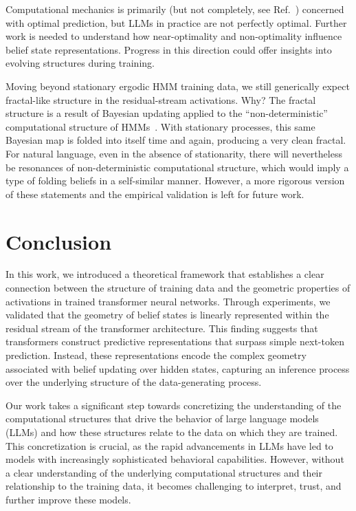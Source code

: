 \documentclass{article}
\begin{document}
Computational mechanics is primarily (but not completely, see Ref.~\cite{marzen2017nearly})  concerned with optimal prediction, but LLMs in practice are not perfectly optimal. Further work is needed to understand how near-optimality and non-optimality influence belief state representations. 
Progress in this direction 
could offer insights into 
evolving structures during
training.

Moving beyond stationary ergodic HMM training data, we still generically expect fractal-like structure in the residual-stream activations. Why? The fractal structure is a result of Bayesian updating applied to the “non-deterministic” computational structure of HMMs~\cite{jurgens2021divergent}. With stationary processes, this same Bayesian map is folded into itself time and again, producing a very clean fractal. For natural language, even in the absence of stationarity, there will nevertheless be resonances of non-deterministic computational structure, which would imply a type of folding beliefs in a self-similar manner. However, a more rigorous version of these statements and the empirical validation is left for future work.


\section{Conclusion}

In this work, we introduced a theoretical framework that establishes a clear connection between the structure of training data and the geometric properties of activations in trained transformer neural networks. %
Through experiments, we validated that the geometry of belief states is linearly represented within the residual stream of the transformer architecture. This finding suggests that transformers construct predictive representations that surpass simple next-token prediction. Instead, these representations encode the complex geometry associated with belief updating over hidden states, capturing an inference process over the underlying structure of the data-generating process.

Our work takes a significant step towards concretizing the understanding of the computational structures that drive the behavior of large language models (LLMs) and how these structures relate to the data on which they are trained. This concretization is crucial, as the rapid advancements in LLMs have led to models with increasingly sophisticated behavioral capabilities. However, without a clear understanding of the underlying computational structures and their relationship to the training data, it becomes challenging to interpret, trust, and further improve these models.
\end{document}
